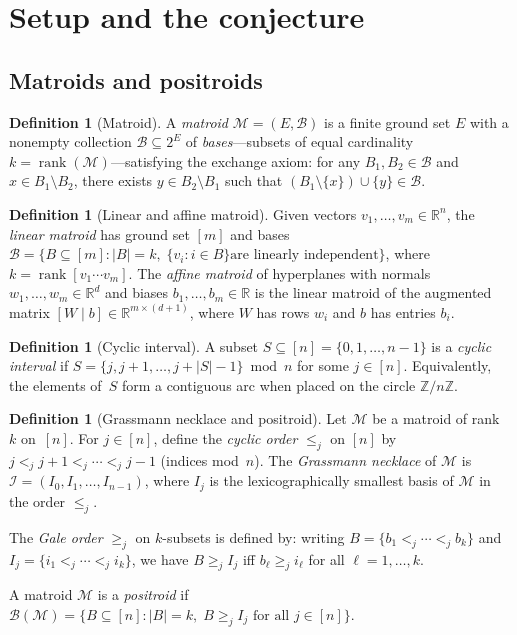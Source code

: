 \documentclass[11pt]{article}
\theoremstyle{definition}
\newtheorem{definition}[theorem]{Definition}
\theoremstyle{remark}
\newcommand{\R}{\mathbb{R}}
\newcommand{\Z}{\mathbb{Z}}
\newcommand{\cI}{\mathcal{I}}
\newcommand{\cB}{\mathcal{B}}
\newcommand{\cM}{\mathcal{M}}
\DeclareMathOperator{\rank}{rank}
\begin{document}
\section{Setup and the conjecture}\label{sec:setup}

\subsection{Matroids and positroids}\label{sec:matroids}

\begin{definition}[Matroid]
  A \emph{matroid} $\cM = (E, \cB)$ is a finite ground set $E$ with
  a nonempty collection $\cB \subseteq 2^E$ of \emph{bases}---subsets
  of equal cardinality $k = \rank(\cM)$---satisfying the exchange
  axiom: for any $B_1, B_2 \in \cB$ and $x \in B_1 \setminus B_2$,
  there exists $y \in B_2 \setminus B_1$ such that
  $(B_1 \setminus \{x\}) \cup \{y\} \in \cB$.
\end{definition}

\begin{definition}[Linear and affine matroid]
  Given vectors $v_1, \ldots, v_m \in \R^n$, the \emph{linear
  matroid} has ground set $[m]$ and bases
  $\cB = \{B \subseteq [m] : |B| = k,\; \{v_i : i \in B\} \text{
  are linearly independent}\}$, where $k = \rank[v_1 \cdots v_m]$.
  The \emph{affine matroid} of hyperplanes with normals
  $w_1, \ldots, w_m \in \R^d$ and biases $b_1, \ldots, b_m \in \R$
  is the linear matroid of the augmented matrix
  $[W \mid b] \in \R^{m \times (d+1)}$, where $W$ has rows $w_i$
  and $b$ has entries $b_i$.
\end{definition}

\begin{definition}[Cyclic interval]\label{def:cyclic-interval}
  A subset $S \subseteq [n] = \{0, 1, \ldots, n{-}1\}$ is a
  \emph{cyclic interval} if $S = \{j, j{+}1, \ldots, j{+}|S|{-}1\}
  \bmod n$ for some $j \in [n]$.  Equivalently, the elements of~$S$
  form a contiguous arc when placed on the circle $\Z/n\Z$.
\end{definition}

\begin{definition}[Grassmann necklace and positroid]
\label{def:grassmann-necklace}
  Let $\cM$ be a matroid of rank~$k$ on~$[n]$.  For $j \in [n]$,
  define the \emph{cyclic order} $\leq_j$ on $[n]$ by
  $j <_j j{+}1 <_j \cdots <_j j{-}1$ (indices mod~$n$).  The
  \emph{Grassmann necklace} of $\cM$ is
  $\cI = (I_0, I_1, \ldots, I_{n-1})$, where $I_j$ is the
  lexicographically smallest basis of $\cM$ in the order $\leq_j$.

  The \emph{Gale order} $\geq_j$ on $k$-subsets is defined by: writing
  $B = \{b_1 <_j \cdots <_j b_k\}$ and
  $I_j = \{i_1 <_j \cdots <_j i_k\}$, we have
  $B \geq_j I_j$ iff $b_\ell \geq_j i_\ell$ for all
  $\ell = 1, \ldots, k$.

  A matroid $\cM$ is a \emph{positroid} if
  $\cB(\cM) = \{B \subseteq [n] : |B| = k,\;
  B \geq_j I_j \text{ for all } j \in [n]\}$.
\end{definition}
\end{document}
